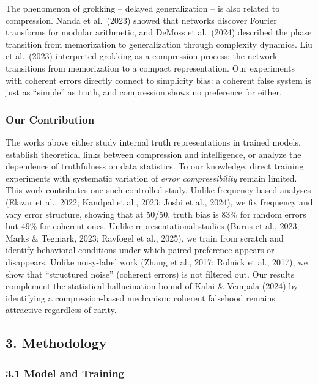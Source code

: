 \documentclass[
  11pt,
]{article}
\begin{document}
The phenomenon of grokking -- delayed generalization -- is also related
to compression. Nanda et al.~(2023) showed that networks discover
Fourier transforms for modular arithmetic, and DeMoss et al.~(2024)
described the phase transition from memorization to generalization
through complexity dynamics. Liu et al.~(2023) interpreted grokking as a
compression process: the network transitions from memorization to a
compact representation. Our experiments with coherent errors directly
connect to simplicity bias: a coherent false system is just as
``simple'' as truth, and compression shows no preference for either.

\subsubsection{Our Contribution}\label{our-contribution}

The works above either study internal truth representations in trained
models, establish theoretical links between compression and
intelligence, or analyze the dependence of truthfulness on data
statistics. To our knowledge, direct training experiments with
systematic variation of \emph{error compressibility} remain limited.
This work contributes one such controlled study. Unlike frequency-based
analyses (Elazar et al., 2022; Kandpal et al., 2023; Joshi et al.,
2024), we fix frequency and vary error structure, showing that at 50/50,
truth bias is 83\% for random errors but 49\% for coherent ones. Unlike
representational studies (Burns et al., 2023; Marks \& Tegmark, 2023;
Ravfogel et al., 2025), we train from scratch and identify behavioral
conditions under which paired preference appears or disappears. Unlike
noisy-label work (Zhang et al., 2017; Rolnick et al., 2017), we show
that ``structured noise'' (coherent errors) is not filtered out. Our
results complement the statistical hallucination bound of Kalai \&
Vempala (2024) by identifying a compression-based mechanism: coherent
falsehood remains attractive regardless of rarity.

\subsection{3. Methodology}\label{methodology}

\subsubsection{3.1 Model and Training}\label{model-and-training}
\end{document}
